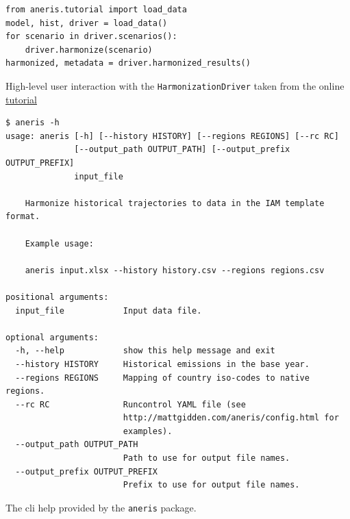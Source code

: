 \documentclass[review]{elsarticle}
\newcommand{\code}[1]{\lstinline[basicstyle=\ttfamily\color{black}]|#1|}
\begin{document}
\begin{listing}[H]
\begin{verbatim}
from aneris.tutorial import load_data
model, hist, driver = load_data()
for scenario in driver.scenarios():
    driver.harmonize(scenario)
harmonized, metadata = driver.harmonized_results()
\end{verbatim}
\caption{High-level user interaction with the \texttt{HarmonizationDriver} taken from the online \href{http://mattgidden.com/aneris/config.html}{tutorial}}
\label{lst:tutorial}
\end{listing}

\begin{listing}[H]
\begin{verbatim}
$ aneris -h
usage: aneris [-h] [--history HISTORY] [--regions REGIONS] [--rc RC]
              [--output_path OUTPUT_PATH] [--output_prefix OUTPUT_PREFIX]
              input_file

    Harmonize historical trajectories to data in the IAM template format.

    Example usage:

    aneris input.xlsx --history history.csv --regions regions.csv

positional arguments:
  input_file            Input data file.

optional arguments:
  -h, --help            show this help message and exit
  --history HISTORY     Historical emissions in the base year.
  --regions REGIONS     Mapping of country iso-codes to native regions.
  --rc RC               Runcontrol YAML file (see
                        http://mattgidden.com/aneris/config.html for
                        examples).
  --output_path OUTPUT_PATH
                        Path to use for output file names.
  --output_prefix OUTPUT_PREFIX
                        Prefix to use for output file names.
\end{verbatim}
\caption{The \gls{cli} help provided by the \code{aneris} package.}
\label{lst:cli}
\end{listing}
\end{document}
